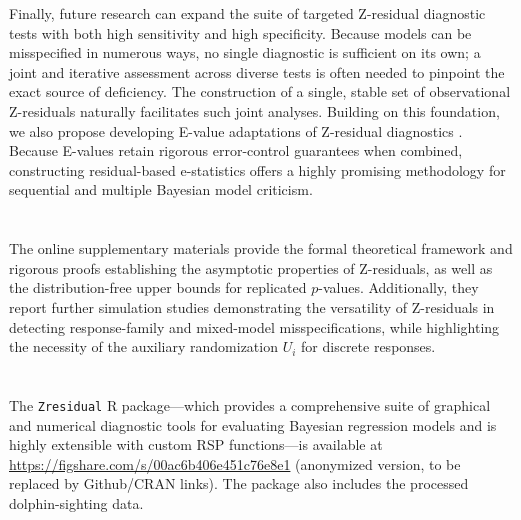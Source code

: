 Finally, future research can expand the suite of targeted Z-residual diagnostic tests with both high sensitivity and high specificity. Because models can be misspecified in numerous ways, no single diagnostic is sufficient on its own; a joint and iterative assessment across diverse tests is often needed to pinpoint the exact source of deficiency. The construction of a single, stable set of observational Z-residuals naturally facilitates such joint analyses. Building on this foundation, we also propose developing E-value adaptations of Z-residual diagnostics \citep{VovkVladimir2021ECCA,RamdasAaditya2023GSaS,Grunwald2024}. Because E-values retain rigorous error-control guarantees when combined, constructing residual-based e-statistics offers a highly promising methodology for sequential and multiple Bayesian model criticism.

\onehalfspacing

\small

\section*{}

The online supplementary materials provide the formal theoretical framework and rigorous proofs establishing the asymptotic properties of Z-residuals, as well as the distribution-free upper bounds for replicated $p$-values. Additionally, they report further simulation studies demonstrating the versatility of Z-residuals in detecting response-family and mixed-model misspecifications, while highlighting the necessity of the auxiliary randomization $U_i$ for discrete responses.

\section*{}

The \texttt{Zresidual} R package---which provides a comprehensive suite of graphical and numerical diagnostic tools for evaluating Bayesian regression models and is highly extensible with custom RSP functions---is available at \url{https://figshare.com/s/00ac6b406e451c76e8e1} (anonymized version, to be replaced by Github/CRAN links). The package also includes the processed dolphin-sighting data.



